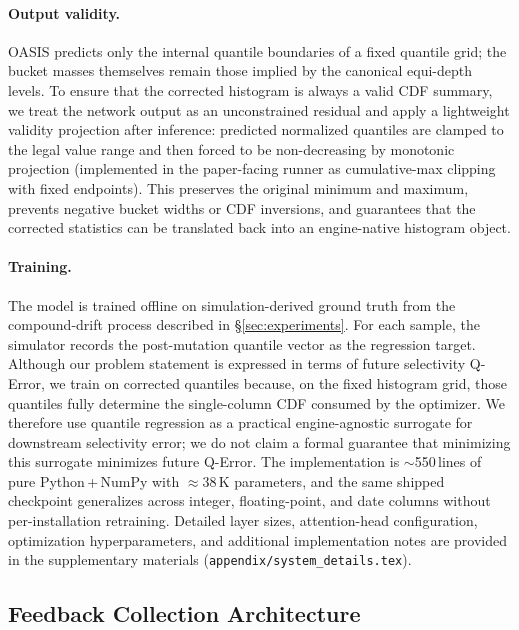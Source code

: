 \documentclass[runningheads]{llncs}
\begin{document}
\paragraph{Output validity.}
OASIS predicts only the internal quantile boundaries of a fixed quantile grid;
the bucket masses themselves remain those implied by the canonical equi-depth
levels. To ensure that the corrected histogram is always a valid CDF summary, we
treat the network output as an unconstrained residual and apply a lightweight
validity projection after inference: predicted normalized quantiles are clamped
to the legal value range and then forced to be non-decreasing by monotonic
projection (implemented in the paper-facing runner as cumulative-max clipping
with fixed endpoints). This preserves the original minimum and maximum,
prevents negative bucket widths or CDF inversions, and guarantees that the
corrected statistics can be translated back into an engine-native histogram
object.

\paragraph{Training.}
The model is trained offline on simulation-derived ground truth from the
compound-drift process described in \S\ref{sec:experiments}. For each sample,
the simulator records the post-mutation quantile vector as the regression
target. Although our problem statement is expressed in terms of future
selectivity Q-Error, we train on corrected quantiles because, on the fixed
histogram grid, those quantiles fully determine the single-column CDF consumed
by the optimizer. We therefore use quantile regression as a practical
engine-agnostic surrogate for downstream selectivity error; we do not claim a
formal guarantee that minimizing this surrogate minimizes future Q-Error. The implementation is $\sim$550\,lines of pure Python\,+\,NumPy
with $\approx$38\,K parameters, and the same shipped checkpoint generalizes
across integer, floating-point, and date columns without per-installation
retraining. Detailed layer sizes, attention-head configuration, optimization
hyperparameters, and additional implementation notes are provided in the
supplementary materials (\texttt{appendix/system\_details.tex}).

\subsection{Feedback Collection Architecture}
\label{sec:feedback}
\end{document}
